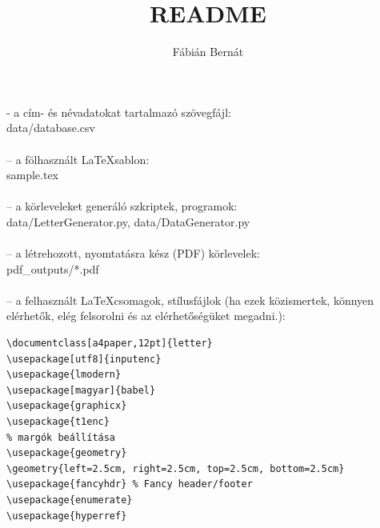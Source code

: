 \documentclass{article}
\title{README}
\author{Fábián Bernát}
\begin{document}
- a cím- és névadatokat tartalmazó szövegfájl:
\\
data/database.csv
\\\\
– a fölhasznált \LaTeX sablon:
\\
sample.tex
\\\\
– a körleveleket generáló szkriptek, programok:
\\
data/LetterGenerator.py, data/DataGenerator.py
\\\\
– a létrehozott, nyomtatásra kész (PDF) körlevelek:
\\
pdf\_outputs/*.pdf
\\\\
– a felhasznált \LaTeX csomagok, stílusfájlok (ha ezek közismertek,
könnyen elérhetők, elég felsorolni és az elérhetőségüket megadni.):
\begin{verbatim}
\documentclass[a4paper,12pt]{letter}
\usepackage[utf8]{inputenc}
\usepackage{lmodern}
\usepackage[magyar]{babel}
\usepackage{graphicx}
\usepackage{t1enc}
% margók beállítása
\usepackage{geometry} 
\geometry{left=2.5cm, right=2.5cm, top=2.5cm, bottom=2.5cm}
\usepackage{fancyhdr} % Fancy header/footer
\usepackage{enumerate}
\usepackage{hyperref}
\end{verbatim}
\end{document}
